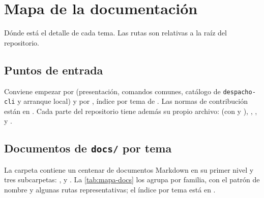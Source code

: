 \chapter{Mapa de la documentación}\label{cap:mapa}

Dónde está el detalle de cada tema. Las rutas son relativas a la raíz del
repositorio.

\section{Puntos de entrada}\label{sec:mapa-entrada}

Conviene empezar por  (presentación, comandos comunes,
catálogo de \texttt{despacho-cli} y arranque local) y por
, índice por tema de . Las normas de
contribución están en . Cada parte del repositorio
tiene además su propio archivo:  (con
 y ),
, ,
 y .

\section{Documentos de \texttt{docs/} por tema}\label{sec:mapa-docs}

La carpeta  contiene un centenar de documentos Markdown en
su primer nivel y tres subcarpetas: ,  y
. La \cref{tab:mapa-docs} los agrupa por familia, con
el patrón de nombre y algunas rutas representativas; el índice por tema está
en .



